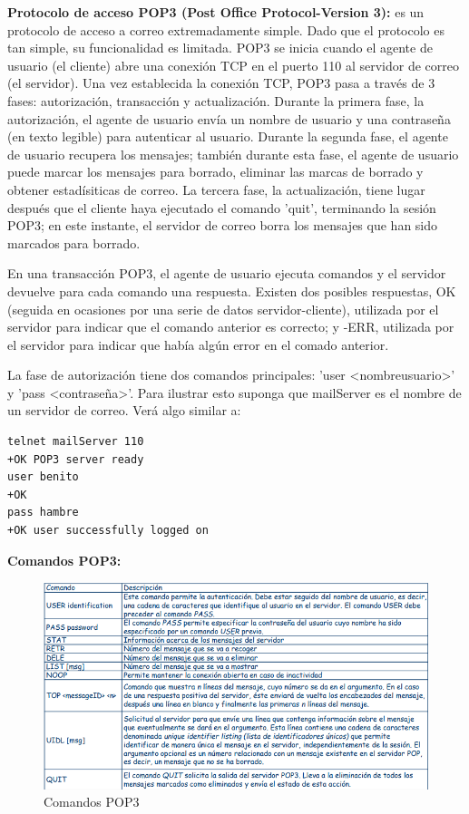 \documentclass[a4paper,11pt]{article}
\begin{document}
\textbf{Protocolo de acceso POP3 (Post Office Protocol-Version 3):} es un protocolo de acceso a correo extremadamente simple. Dado que el protocolo es tan simple, su funcionalidad es limitada. POP3 se inicia cuando el agente de usuario (el cliente) abre una conexión TCP en el puerto 110 al servidor de correo (el servidor). Una vez establecida la conexión TCP, POP3 pasa a través de 3 fases: autorización, transacción y actualización. Durante la primera fase, la autorización, el agente de usuario envía un nombre de usuario y una contraseña (en texto legible) para autenticar al usuario. Durante la segunda fase, el agente de usuario recupera los mensajes; también durante esta fase, el agente de usuario puede marcar los mensajes para borrado, eliminar las marcas de borrado y obtener estadísiticas de correo. La tercera fase, la actualización, tiene lugar después que el cliente haya ejecutado el comando 'quit', terminando la sesión POP3; en este instante, el servidor de correo borra los mensajes que han sido marcados para borrado. 

En una transacción POP3, el agente de usuario ejecuta comandos y el servidor devuelve para cada comando una respuesta. Existen dos posibles respuestas, OK (seguida en ocasiones por una serie de datos servidor-cliente), utilizada por el servidor para indicar que el comando anterior es correcto; y -ERR, utilizada por el servidor para indicar que había algún error en el comado anterior.

La fase de autorización tiene dos comandos principales: 'user <nombreusuario>' y 'pass <contraseña>'. Para ilustrar esto suponga que mailServer es el nombre de un servidor de correo. Verá algo similar a:

\begin{verbatim}
telnet mailServer 110
+OK POP3 server ready
user benito
+OK
pass hambre
+OK user successfully logged on
\end{verbatim}

\textbf{Comandos POP3:}
\begin{figure}[h]
\centering
\caption{Comandos POP3}
\includegraphics[scale=1,width=1.1\textwidth]{comando_pop3.png}
\end{figure}
\end{document}
